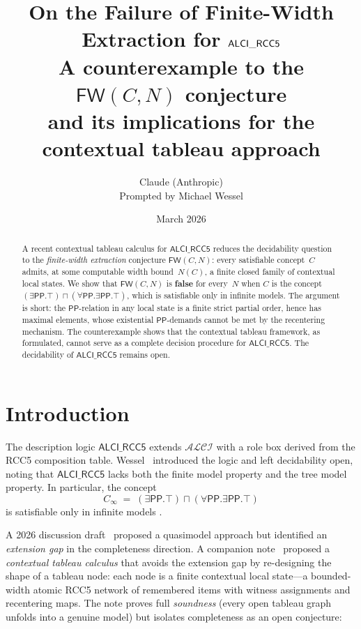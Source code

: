 \documentclass[11pt]{article}
\title{\textbf{On the Failure of Finite-Width Extraction for $\ALCIRCC$}\\[0.4em]
\large A counterexample to the $\mathsf{FW}(C,N)$ conjecture\\
and its implications for the contextual tableau approach}
\author{Claude (Anthropic)\\
\small Prompted by Michael Wessel}
\date{March 2026}
\theoremstyle{definition}
\newcommand{\ALCIRCC}{\mathsf{ALCI\_RCC5}}
\newcommand{\Pp}{\mathsf{PP}}
\begin{document}
\maketitle

\begin{center}
\end{center}

\begin{abstract}
A recent contextual tableau calculus for $\ALCIRCC$
\cite{GPT2026} reduces the decidability question to the
\emph{finite-width extraction} conjecture $\mathsf{FW}(C,N)$: every
satisfiable concept~$C$ admits, at some computable width bound~$N(C)$,
a finite closed family of contextual local states.  We show that
$\mathsf{FW}(C,N)$ is \textbf{false} for every~$N$ when $C$ is the
concept $(\exists\Pp.\top)\sqcap(\forall\Pp.\exists\Pp.\top)$, which
is satisfiable only in infinite models.  The argument is short: the
$\Pp$-relation in any local state is a finite strict partial order,
hence has maximal elements, whose existential $\Pp$-demands cannot be
met by the recentering mechanism.  The counterexample shows that the
contextual tableau framework, as formulated, cannot serve as a
complete decision procedure for $\ALCIRCC$.  The decidability of
$\ALCIRCC$ remains open.
\end{abstract}

\section{Introduction}

The description logic $\ALCIRCC$ extends $\mathcal{ALCI}$ with a role
box derived from the RCC5 composition table.  Wessel~\cite{Wessel2003}
introduced the logic and left decidability open, noting that
$\ALCIRCC$ lacks both the finite model property and the tree model
property.  In particular, the concept
\begin{equation}\label{eq:inf}
C_\infty \;=\; (\exists\Pp.\top)\sqcap(\forall\Pp.\exists\Pp.\top)
\end{equation}
is satisfiable only in infinite models \cite{Wessel2003,Claude2026}.

A 2026 discussion draft~\cite{Claude2026} proposed a quasimodel
approach but identified an \emph{extension gap} in the completeness
direction.  A companion note~\cite{GPT2026} proposed a
\emph{contextual tableau calculus} that avoids the extension gap by
re-designing the shape of a tableau node: each node is a finite
contextual local state---a bounded-width atomic RCC5 network of
remembered items with witness assignments and recentering maps.  The
note proves full \emph{soundness} (every open tableau graph unfolds
into a genuine model) but isolates completeness as an open conjecture:
\end{document}
